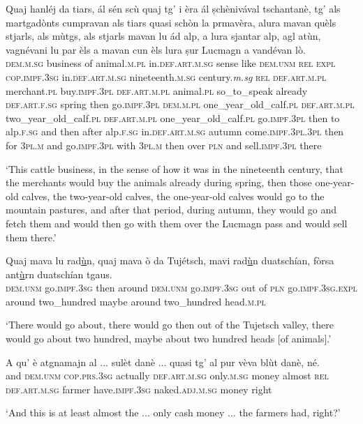\begin{linenumbers}
\gll Quaj hanléj da tiars, ál sén scù quaj tg' i èra ál ṣchènivával tschantanè, tg' als martgadònts cumpravan als tiars quasi schòn la prmavèra, alura mavan quèls stjarls, als mùtgs, als stjarls mavan lu ád alp, a lura sjantar alp, agl atùn, vagnévani lu par èls a mavan cun èls lura ṣur Lucmagn a vandévan lò.\\
\textsc{dem.m.sg} business of animal.\textsc{m.pl} in.\textsc{def.art.m.sg} sense like \textsc{dem.unm} \textsc{rel} \textsc{expl} \textsc{cop.impf.3sg} in.\textsc{def.art.m.sg} nineteenth.\textsc{m.sg} century.\textit{m.sg} \textsc{rel} \textsc{def.art.m.pl} merchant.\textsc{pl} buy.\textsc{impf.3pl} \textsc{def.art.m.pl} animal.\textsc{pl} so\_to\_speak already \textsc{def.art.f.sg} spring then go.\textsc{impf.3pl} \textsc{dem.m.pl} one\_year\_old\_calf.\textsc{pl} \textsc{def.art.m.pl} two\_year\_old\_calf.\textsc{pl} \textsc{def.art.m.pl} one\_year\_old\_calf.\textsc{pl} go.\textsc{impf.3pl} then to alp.\textsc{f.sg} and then after alp.\textsc{f.sg} in.\textsc{def.art.m.sg} autumn come.\textsc{impf.3pl.3pl} then for \textsc{3pl.m} and go.\textsc{impf.3pl} with \textsc{3pl.m} then over \textsc{pln} and sell.\textsc{impf.3pl} there\\
\end{linenumbers}
\medskip
\glt`This cattle business, in the sense of how it was in the nineteenth century, that the merchants would buy the animals already during spring, then those one-year-old calves, the two-year-old calves, the one-year-old calves would go to the mountain pastures, and after that period, during autumn, they would go and fetch them and would then go with them over the Lucmagn pass and would sell them there.'
\medskip

\begin{linenumbers}
\gll Quaj mava lu rad\underline{ù}n, quaj mava ò da Tujétsch, mavi rad\underline{ù}n duatschían, fòrsa ant\underline{ù}rn duatschían tgaus.\\
\textsc{dem.unm} go.\textsc{impf.3sg} then around \textsc{dem.unm} go.\textsc{impf.3sg} out of \textsc{pln} go.\textsc{impf.3sg.expl} around two\_hundred maybe around two\_hundred head.\textsc{m.pl}\\
\end{linenumbers}
\medskip
\glt `There would go about, there would go then out of the Tujetsch valley, there would go about two hundred, maybe about two hundred heads [of animals].'
\medskip

\begin{linenumbers}
\gll A qu’ è atgnamajn al ... sulèt danè ... quasi tg’ al pur vèva blùt danè, né.\\
and \textsc{dem.unm} \textsc{cop.prs.3sg} actually \textsc{def.art.m.sg} {} only.\textsc{m.sg} money {} almost \textsc{rel} \textsc{def.art.m.sg} farmer have.\textsc{impf.3sg} naked.\textsc{adj.m.sg} money right \\ 
\end{linenumbers}
\medskip
\glt `And this is at least almost the ... only cash money ... the farmers had, right?'
\medskip

